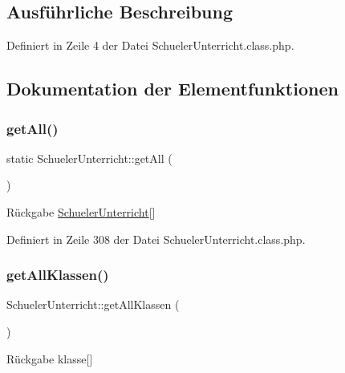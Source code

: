 \subsection{Ausführliche Beschreibung}


Definiert in Zeile 4 der Datei Schueler\+Unterricht.\+class.\+php.



\subsection{Dokumentation der Elementfunktionen}
\mbox{\label{class_schueler_unterricht_a92763c50b3bb20caba9480fd61b0cfaa}} 
\subsubsection{\texorpdfstring{get\+All()}{getAll()}}
{\footnotesize\ttfamily static Schueler\+Unterricht\+::get\+All (\begin{DoxyParamCaption}{ }\end{DoxyParamCaption})\hspace{0.3cm}{\ttfamily [static]}}

\begin{DoxyReturn}{Rückgabe}
\mbox{\hyperlink{class_schueler_unterricht}{Schueler\+Unterricht}}\mbox{[}\mbox{]} 
\end{DoxyReturn}


Definiert in Zeile 308 der Datei Schueler\+Unterricht.\+class.\+php.

\mbox{\label{class_schueler_unterricht_a5a7367ad075083f4a1c945f795809c0c}} 
\subsubsection{\texorpdfstring{get\+All\+Klassen()}{getAllKlassen()}}
{\footnotesize\ttfamily Schueler\+Unterricht\+::get\+All\+Klassen (\begin{DoxyParamCaption}{ }\end{DoxyParamCaption})}

\begin{DoxyReturn}{Rückgabe}
klasse\mbox{[}\mbox{]} 
\end{DoxyReturn}


